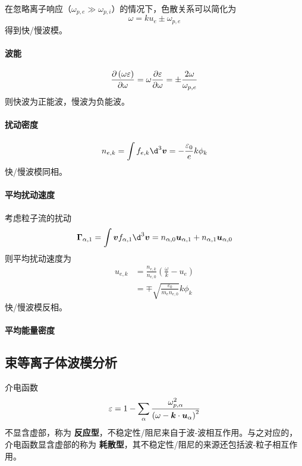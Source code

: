 在忽略离子响应（$\omega_{p,e} \gg \omega_{p,i}$）的情况下，色散关系可以简化为
\begin{equation}
\omega = k u_e \pm \omega_{p,e}
\end{equation}
得到快/慢波模。

\paragraph{波能}
\begin{equation}
\pdv{\left(\omega \varepsilon\right)}{\omega}
= \omega \pdv{\varepsilon}{\omega}
= \pm \frac{2 \omega}{\omega_{p,e}}
\end{equation}
则快波为正能波，慢波为负能波。

\paragraph{扰动密度}
\begin{equation}
n_{e,k} = \int f_{e,k} \d^3\vector{v}
= - \frac{\varepsilon_0}{e} k \phi_k
\end{equation}
快/慢波模同相。

\paragraph{平均扰动速度}
考虑粒子流的扰动
\begin{equation}
\vector{\Gamma}_{\alpha,1} = \int \vector{v} f_{\alpha,1} \d^3\vector{v}
= n_{\alpha,0} \vector{u}_{\alpha,1} + n_{\alpha,1} \vector{u}_{\alpha,0}
\end{equation}
则平均扰动速度为
\begin{equation}\begin{aligned}
u_{e,k} &= \frac{n_{e,k}}{n_{e,0}} \left(\frac{\omega}{k} - u_e \right) \\
&= \mp \sqrt{\frac{\varepsilon_0}{m_e n_{e,0}}} k \phi_k
\end{aligned}\end{equation}
快/慢波模反相。

\paragraph{平均能量密度}

\subsection{束等离子体波模分析}

介电函数
\begin{equation}
\varepsilon = 1 - \sum_\alpha \frac{\omega_{p,\alpha}^2}{\left( \omega - \bm{k} \cdot \bm{u}_\alpha \right)^2}
\end{equation}
不显含虚部，称为 \textbf{反应型}，不稳定性/阻尼来自于波-波相互作用。与之对应的，介电函数显含虚部的称为 \textbf{耗散型}，其不稳定性/阻尼的来源还包括波-粒子相互作用。

